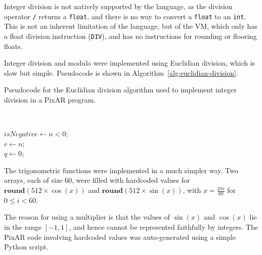 \documentclass[11pt,a4paper]{scrartcl}
\begin{document}
Integer division is not natively supported by the language, as the division operator \verb|/| returns a \verb|float|, and there is no way to convert a \verb|float| to an \verb|int|. This is not an inherent limitation of the language, but of the VM, which only has a float division instruction (\verb|DIV|), and has no instructions for rounding or flooring floats.

Integer division and modulo were implemented using Euclidian division\cite{herstein1991}, which is slow but simple. Pseudocode is shown in Algorithm~\ref{alg:euclidian-division}.

\begin{algorithm}
   \caption{Pseudocode for the Euclidian division algorithm used to implement integer division in a PixAR program.}~\label{alg:euclidian-division}

    $isNegative \gets n < 0$;\\
    $r \gets n$;\\
    $q \gets 0$; \\
\end{algorithm}

The trigonometric functions were implemented in a much simpler way. Two arrays, each of size $60$, were filled with hardcoded values for $\mathbf{round}(512 \times \cos(x))$ and $\mathbf{round}(512 \times \sin(x))$, with $x = \frac{2\pi i}{60}$ for $0 \le i < 60$.

The reason for using a multiplier is that the values of $\sin(x)$ and $\cos(x)$ lie in the range $[-1, 1]$, and hence cannot be represented faithfully by integers. The PixAR code involving hardcoded values was auto-generated using a simple Python script.
\end{document}
